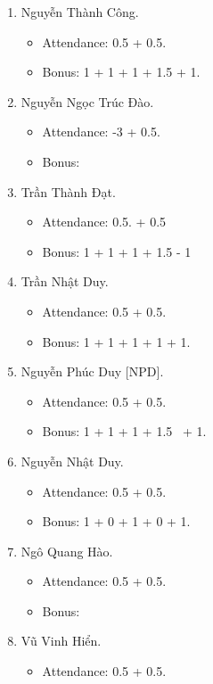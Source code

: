 \documentclass{article}
\begin{document}
\begin{enumerate}
    \item {\sc Nguyễn Thành Công.}
    \begin{itemize}
        \item Attendance: 0.5 + 0.5.
        \item Bonus: 1 + 1 + 1 + 1.5 + 1.
    \end{itemize}
    \item {\sc Nguyễn Ngọc Trúc Đào.}
    \begin{itemize}
        \item Attendance: -3 + 0.5.
        \item Bonus:
    \end{itemize}
    \item {\sc Trần Thành Đạt.}
    \begin{itemize}
        \item Attendance: 0.5. + 0.5
        \item Bonus: 1 + 1 + 1 + 1.5 - 1
    \end{itemize}
    \item {\sc Trần Nhật Duy.}
    \begin{itemize}
        \item Attendance: 0.5 + 0.5.
        \item Bonus: 1 + 1 + 1 + 1 + 1.
    \end{itemize}
    \item {\sc Nguyễn Phúc Duy [NPD].}
    \begin{itemize}
        \item Attendance: 0.5 + 0.5.
        \item Bonus: 1 + 1 + 1 + 1.5  + 1.
    \end{itemize}
    \item {\sc Nguyễn Nhật Duy.}
    \begin{itemize}
        \item Attendance: 0.5 + 0.5.
        \item Bonus: 1 + 0 + 1 + 0 + 1.
    \end{itemize}
    \item {\sc Ngô Quang Hào.}
    \begin{itemize}
        \item Attendance: 0.5 + 0.5.
        \item Bonus:
    \end{itemize}
    \item {\sc Vũ Vinh Hiển.}
    \begin{itemize}
        \item Attendance: 0.5 + 0.5.

\end{itemize}
\end{enumerate}
\end{document}
